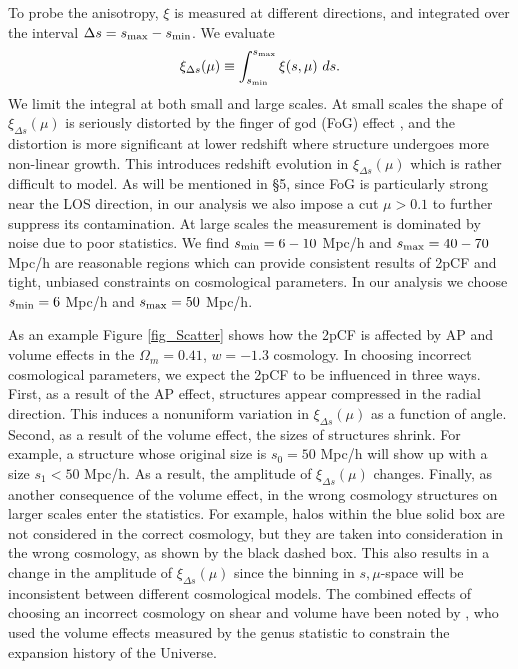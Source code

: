 \documentclass[useAMS,usenatbib]{mn2e}
\begin{document}
To probe the anisotropy, $\xi$ is measured at different directions, 
and integrated over the interval $\Delta s = s_{\rm max} - s_{\rm min}$.
We evaluate
\begin{equation}
\xi_{\Delta s} (\mu) \equiv \int_{s_{\rm min}}^{s_{\rm max}} \xi (s,\mu)\ ds.%
\end{equation}
We limit the integral at both small and large scales.
At small scales the shape of $\xi_{\Delta s}(\mu)$ is seriously distorted by the finger of god (FoG) effect \citep{FoG}, 
and the distortion is more significant at lower redshift where structure undergoes more non-linear growth.
This introduces redshift evolution in $\xi_{\Delta s}(\mu)$ which is rather difficult to model.
As will be mentioned in \S 5, since FoG is particularly strong near the LOS direction,
in our analysis we also impose a cut $\mu>0.1$ to further suppress its contamination.
At large scales the measurement is dominated by noise due to poor statistics.
We find $s_{\rm min}=6-10$ Mpc/h and $s_{\rm max}=40-70$ Mpc/h are reasonable regions which can provide consistent results of 2pCF 
and tight, unbiased constraints on cosmological parameters.
In our analysis we choose $s_{\rm min}=6$ Mpc/h and $s_{\rm max}=50$ Mpc/h.

As an example Figure \ref{fig_Scatter} shows how the 2pCF is affected by AP and volume effects in the $\Omega_m=0.41$, $w=-1.3$ cosmology.
In choosing incorrect cosmological parameters, we expect the 2pCF to be influenced in three ways.
First, as a result of the AP effect, structures appear compressed in the radial direction.
This induces a nonuniform  variation in $\xi_{\Delta s}(\mu)$ as a function of angle.
Second, as a result of the volume effect, the sizes of structures shrink.
For example, a structure whose original size is $s_0=50$ Mpc/h will show up with a size $s_1<50$ Mpc/h.
As a result, the amplitude of $\xi_{\Delta s}(\mu)$ changes.
Finally, as another consequence of the volume effect, in the wrong cosmology structures on larger scales enter the statistics.
For example, halos within the blue solid box are not considered in the correct cosmology,
but they are taken into consideration in the wrong cosmology, as shown by the black dashed box.
This also results in a change in the amplitude of $\xi_{\Delta s}(\mu)$ since the binning in $s,\mu$-space will be 
inconsistent between different cosmological models. The combined effects of choosing an incorrect cosmology 
on shear and volume have been noted by \citet{topology}, who used the volume effects measured by the genus 
statistic to constrain the expansion history of the Universe.
\end{document}
